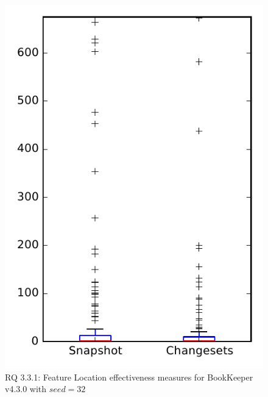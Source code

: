 
\begin{figure}
\centering
\includegraphics[height=0.4\textheight]{figures/flt_seed/rq1_bookkeeper_32}
\caption{RQ 3.3.1: Feature Location effectiveness measures for BookKeeper v4.3.0 with $seed=32$}
\label{fig:flt_seed:rq1:bookkeeper}
\end{figure}
